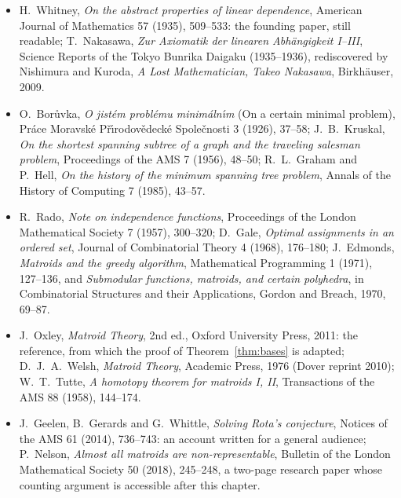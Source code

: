 \begin{itemize}
\item H.~Whitney, \emph{On the abstract properties of linear dependence}, American Journal of Mathematics 57 (1935), 509--533: the founding paper, still readable; T.~Nakasawa, \emph{Zur Axiomatik der linearen
Abh\"angigkeit I--III}, Science Reports of the Tokyo Bunrika Daigaku (1935--1936), rediscovered by Nishimura and Kuroda, \emph{A Lost Mathematician, Takeo Nakasawa}, Birkh\"auser, 2009.
\item O.~Bor\r{u}vka, \emph{O jist\'em probl\'emu minim\'aln\'\i m} (On a certain minimal problem), Pr\'ace Moravsk\'e P\v{r}\'\i rodov\v{e}deck\'e Spole\v{c}nosti 3 (1926), 37--58; J.~B.~Kruskal, \emph{On the shortest spanning
subtree of a graph and the traveling salesman problem}, Proceedings of the AMS 7 (1956), 48--50; R.~L.~Graham and P.~Hell, \emph{On the history of the minimum spanning tree problem}, Annals of the History of
Computing 7 (1985), 43--57.
\item R.~Rado, \emph{Note on independence functions}, Proceedings of the London Mathematical Society 7 (1957), 300--320; D.~Gale, \emph{Optimal assignments in an ordered set}, Journal of Combinatorial Theory 4
(1968), 176--180; J.~Edmonds, \emph{Matroids and the greedy algorithm}, Mathematical Programming 1 (1971), 127--136, and \emph{Submodular functions, matroids, and certain polyhedra}, in Combinatorial Structures
and their Applications, Gordon and Breach, 1970, 69--87.
\item J.~Oxley, \emph{Matroid Theory}, 2nd ed., Oxford University Press, 2011: the reference, from which the proof of Theorem~\ref{thm:bases} is adapted; D.~J.~A.~Welsh, \emph{Matroid Theory}, Academic Press, 1976
(Dover reprint 2010); W.~T.~Tutte, \emph{A homotopy theorem for matroids I, II}, Transactions of the AMS 88 (1958), 144--174.
\item J.~Geelen, B.~Gerards and G.~Whittle, \emph{Solving Rota's conjecture}, Notices of the AMS 61 (2014), 736--743: an account written for a general audience; P.~Nelson, \emph{Almost all matroids are
non-representable}, Bulletin of the London Mathematical Society 50 (2018), 245--248, a two-page research paper whose counting argument is accessible after this chapter.
\end{itemize}
